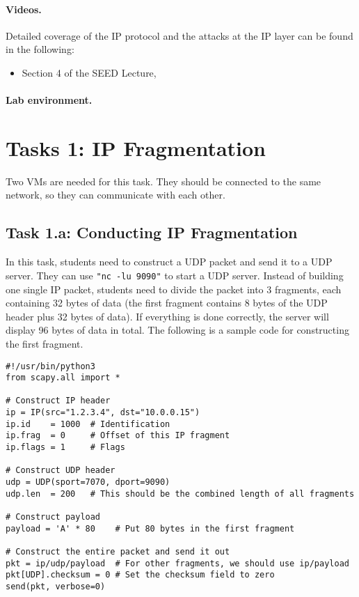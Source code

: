 \paragraph{Videos.}
Detailed coverage of the IP protocol and the attacks at the IP layer can be found 
in the following:

\begin{itemize}
\item Section 4 of the SEED Lecture, \seedisvideo
\end{itemize}


\paragraph{Lab environment.} \seedenvironment


\section{Tasks 1: IP Fragmentation}

Two VMs are needed for this task. They should be connected to the same network, so they
can communicate with each other.

\subsection{Task 1.a: Conducting IP Fragmentation}

In this task, students need to construct a UDP packet and send it to a UDP 
server. They can use \texttt{"nc -lu 9090"} to start a UDP server. 
Instead of building one single IP packet, students need to 
divide the packet into 3 fragments, each containing 32 bytes of data (the
first fragment contains 8 bytes of the UDP header plus 32 bytes of data).
If everything is done correctly, the server will display
96 bytes of data in total.  
The following is a sample code for constructing the first fragment.

\begin{lstlisting}
#!/usr/bin/python3
from scapy.all import *

# Construct IP header
ip = IP(src="1.2.3.4", dst="10.0.0.15")
ip.id    = 1000  # Identification
ip.frag  = 0     # Offset of this IP fragment
ip.flags = 1     # Flags

# Construct UDP header
udp = UDP(sport=7070, dport=9090)
udp.len  = 200   # This should be the combined length of all fragments

# Construct payload
payload = 'A' * 80    # Put 80 bytes in the first fragment

# Construct the entire packet and send it out
pkt = ip/udp/payload  # For other fragments, we should use ip/payload
pkt[UDP].checksum = 0 # Set the checksum field to zero
send(pkt, verbose=0)
\end{lstlisting}


